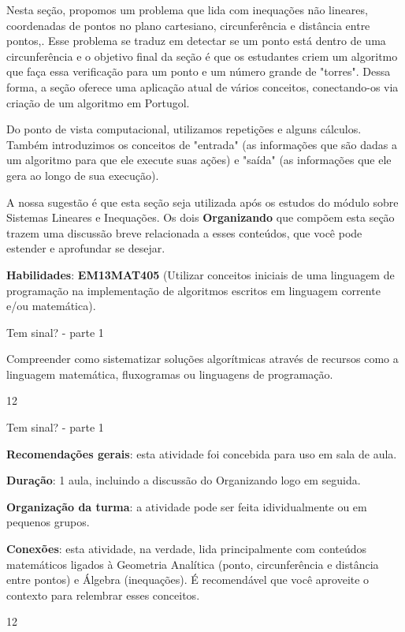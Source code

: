 \label{comp-exp10}
\begin{texto}
{
Nesta seção, propomos um problema que lida com inequações não lineares, coordenadas de pontos no plano cartesiano, circunferência e distância entre pontos,. Esse problema se traduz em detectar se um ponto está dentro de uma circunferência e o objetivo final da seção é que os estudantes criem um algoritmo que faça essa verificação para um ponto e um número grande de "torres". Dessa forma, a seção oferece uma aplicação atual de vários conceitos, conectando-os via criação de um algoritmo em Portugol.

Do ponto de vista computacional, utilizamos repetições e alguns cálculos. Também introduzimos os conceitos de "entrada"{} (as informações que são dadas a um algoritmo para que ele execute suas ações) e "saída"{} (as informações que ele gera ao longo de sua execução).

A nossa sugestão é que esta seção seja utilizada após os estudos do módulo sobre Sistemas Lineares e Inequações. Os dois \textbf{Organizando} que compõem esta seção trazem uma discussão breve relacionada a esses conteúdos, que você pode estender e aprofundar se desejar.

\textbf{Habilidades}: \textbf{EM13MAT405} (Utilizar conceitos iniciais de uma linguagem de programação na implementação de algoritmos escritos em linguagem corrente e/ou matemática).
}
\end{texto}
\clearmargin
\begin{objectives}{Tem sinal? - parte 1}
{
Compreender como sistematizar soluções algorítmicas através de recursos como a linguagem matemática, fluxogramas ou linguagens de programação.


}{1}{2}
\end{objectives}
\begin{sugestions}{Tem sinal? - parte 1}
{
\textbf{Recomendações gerais}: esta atividade foi concebida para uso em sala de aula.

\textbf{Duração}: 1 aula, incluindo a discussão do Organizando logo em seguida.

\textbf{Organização da turma}: a atividade pode ser feita idividualmente ou em pequenos grupos.

\textbf{Conexões}: esta atividade, na verdade, lida principalmente com conteúdos matemáticos ligados à Geometria Analítica (ponto, circunferência e distância entre pontos) e Álgebra (inequações). É recomendável que você aproveite o contexto para relembrar esses conceitos.


}{1}{2}
\end{sugestions}
